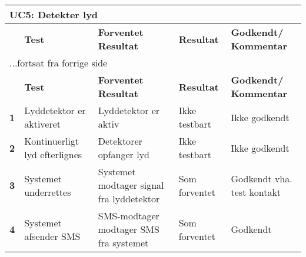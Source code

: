 
\begin{center}
\begin{longtable}{|p{}|p{}|p{}|p{}|p{}|} %
\hline
\multicolumn{5}{|l|}{\textbf{UC5: Detekter lyd}} \\ \hline
\multicolumn{1}{|c|}{} &
\textbf{Test} &
\textbf{Forventet \newline Resultat} &
\textbf{Resultat} &
\textbf{Godkendt/ \newline Kommentar} \\ \hline 
\endfirsthead

\multicolumn{5}{l}{...fortsat fra forrige side} \\ \hline 
\multicolumn{1}{|c|}{} &
\textbf{Test} &
\textbf{Forventet \newline Resultat} &
\textbf{Resultat} &
\textbf{Godkendt/ \newline Kommentar} \\ \hline 
\endhead



\textbf{1}		
&Lyddetektor er aktiveret
&Lyddetektor er aktiv	
&Ikke \newline testbart
&Ikke \newline godkendt \\\hline
\textbf{2}		
&Kontinuerligt lyd efterlignes	
&Detektorer opfanger lyd
&Ikke \newline testbart
&Ikke \newline godkendt \\\hline
\textbf{3}		
&Systemet underrettes	
&Systemet modtager signal fra lyddetektor 
&Som \newline forventet	
&Godkendt \newline vha. test kontakt  \\\hline
\textbf{4}		
&Systemet afsender SMS
&SMS-modtager modtager SMS fra systemet
&Som \newline forventet	
&Godkendt  \\\hline
	\end{longtable}
	\label{ATUC5} 
\end{center}

